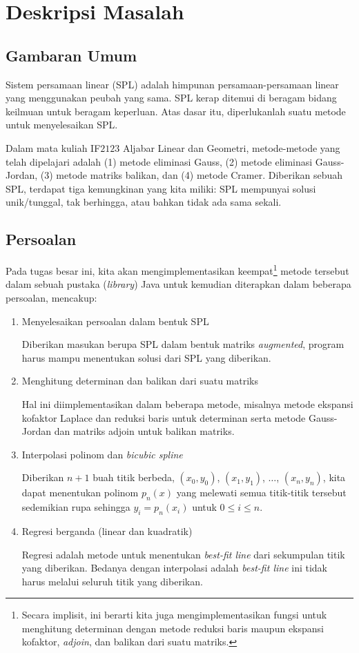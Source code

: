 \section{Deskripsi Masalah}
\subsection{Gambaran Umum}
Sistem persamaan linear (SPL) adalah himpunan persamaan-persamaan linear yang menggunakan peubah yang sama. SPL kerap ditemui di beragam bidang keilmuan untuk beragam keperluan. Atas dasar itu, diperlukanlah suatu metode untuk menyelesaikan SPL. 

Dalam mata kuliah IF$2123$ Aljabar Linear dan Geometri, metode-metode yang telah dipelajari adalah (1) metode eliminasi Gauss, (2) metode eliminasi Gauss-Jordan, (3) metode matriks balikan, dan (4) metode Cramer. Diberikan sebuah SPL, terdapat tiga kemungkinan yang kita miliki: SPL mempunyai solusi unik/tunggal, tak berhingga, atau bahkan tidak ada sama sekali.

\subsection{Persoalan}
\par Pada tugas besar ini, kita akan mengimplementasikan keempat\footnote{Secara implisit, ini berarti kita juga mengimplementasikan fungsi untuk menghitung determinan dengan metode reduksi baris maupun ekspansi kofaktor, \textit{adjoin}, dan balikan dari suatu matriks.} metode tersebut dalam sebuah pustaka (\textit{library}) Java untuk kemudian diterapkan dalam beberapa persoalan, mencakup:
\begin{enumerate}
    \item Menyelesaikan persoalan dalam bentuk SPL
    
    Diberikan masukan berupa SPL dalam bentuk matriks \textit{augmented}, program harus mampu menentukan solusi dari SPL yang diberikan.
    
    \item Menghitung determinan dan balikan dari suatu matriks

    Hal ini diimplementasikan dalam beberapa metode, misalnya metode ekspansi kofaktor Laplace dan reduksi baris untuk determinan serta metode Gauss-Jordan dan matriks adjoin untuk balikan matriks.
    
    \item Interpolasi polinom dan \textit{bicubic spline}
    
    Diberikan $n+1$ buah titik berbeda, $(x_0, y_0)$, $(x_1, y_1)$, $\ldots$, $(x_n, y_n)$, kita dapat menentukan polinom $p_n(x)$ yang melewati semua titik-titik tersebut sedemikian rupa sehingga $y_i = p_n(x_i)$ untuk $0 \leq i \leq n$.

    \item Regresi berganda (linear dan kuadratik)
    
    Regresi adalah metode untuk menentukan \textit{best-fit line} dari sekumpulan titik yang diberikan. Bedanya dengan interpolasi adalah \textit{best-fit line} ini tidak harus melalui seluruh titik yang diberikan.
\end{enumerate}

